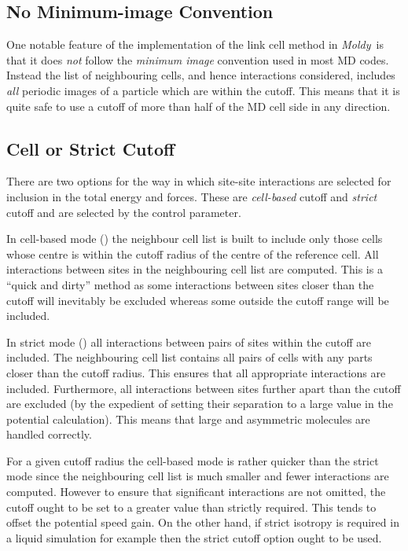 \documentclass[a4paper,twoside]{report}
\newcommand{\moldy}{\emph{Moldy}}
\begin{document}
\subsection{No Minimum-image Convention}
One notable feature of the implementation of the link cell method in
\moldy\ is that it does \emph{not} follow the \emph{minimum image}
convention used in most MD codes.  Instead the list of neighbouring
cells, and hence interactions considered, includes \emph{all} periodic
images of a particle which are within the cutoff.  This means that it
is quite safe to use a cutoff of more than half of the MD cell side in
any direction.  

\subsection{Cell or Strict Cutoff}
\label{sec:strict-cutoff}
There are two options for the way in which site-site interactions are
selected for inclusion in the total energy and forces.  These are
\emph{cell-based} cutoff and \emph{strict} cutoff and are selected
by the  control parameter.

In cell-based mode () the neighbour cell list is
built to include only those cells whose centre is within the cutoff
radius of the centre of the reference cell.  All interactions between
sites in the neighbouring cell list are computed.  This is a ``quick
and dirty'' method as some interactions between sites closer than the
cutoff will inevitably be excluded whereas some outside the cutoff
range will be included.

In strict mode () all interactions between pairs
of sites within the cutoff are included.  The neighbouring cell list
contains all pairs of cells with any parts closer than the cutoff
radius.  This ensures that all appropriate interactions are included.
Furthermore, all interactions between sites further apart than the
cutoff are excluded (by the expedient of setting their separation to a
large value in the potential calculation).  This means that large and
asymmetric molecules are handled correctly.

For a given cutoff radius the cell-based mode is rather quicker than
the strict mode since the neighbouring cell list is much smaller and
fewer interactions are computed.  However to ensure that significant
interactions are not omitted, the cutoff ought to be set to a
greater value than strictly required.    This tends to offset the
potential speed gain.   On the other hand, if strict isotropy is
required in a liquid simulation for example then the strict cutoff
option ought to be used.
\end{document}
